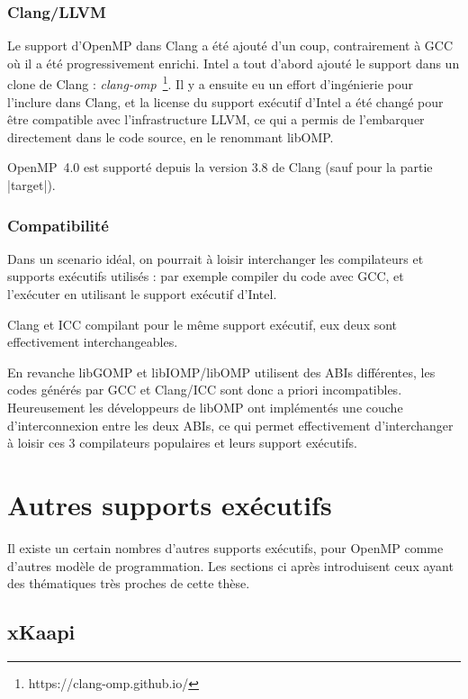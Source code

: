 \subsubsection{Clang/LLVM}

Le support d'OpenMP dans Clang a été ajouté d'un coup, contrairement à GCC où il a été progressivement enrichi.
Intel a tout d'abord ajouté le support dans un clone de Clang : \emph{clang-omp}~\footnote{https://clang-omp.github.io/}.
Il y a ensuite eu un effort d'ingénierie pour l'inclure dans Clang, et la license du support exécutif d'Intel a été changé pour être compatible avec l'infrastructure LLVM, ce qui a permis de l'embarquer directement dans le code source, en le renommant libOMP.

OpenMP~4.0 est supporté depuis la version 3.8 de Clang (sauf pour la partie |target|).

\subsubsection{Compatibilité}

Dans un scenario idéal, on pourrait à loisir interchanger les compilateurs et supports exécutifs utilisés : par exemple compiler du code avec GCC, et l'exécuter en utilisant le support exécutif d'Intel.

Clang et ICC compilant pour le même support exécutif, eux deux sont effectivement interchangeables.

En revanche libGOMP et libIOMP/libOMP utilisent des ABIs différentes, les codes générés par GCC et Clang/ICC sont donc a priori incompatibles.
Heureusement les développeurs de libOMP ont implémentés une couche d'interconnexion entre les deux ABIs, ce qui permet effectivement d'interchanger à loisir ces 3 compilateurs populaires et leurs support exécutifs.

\section{Autres supports exécutifs}\label{sec:rw:other-runtimes}

Il existe un certain nombres d'autres supports exécutifs, pour OpenMP comme d'autres modèle de programmation.
Les sections ci après introduisent ceux ayant des thématiques très proches de cette thèse.

\subsection{xKaapi}

